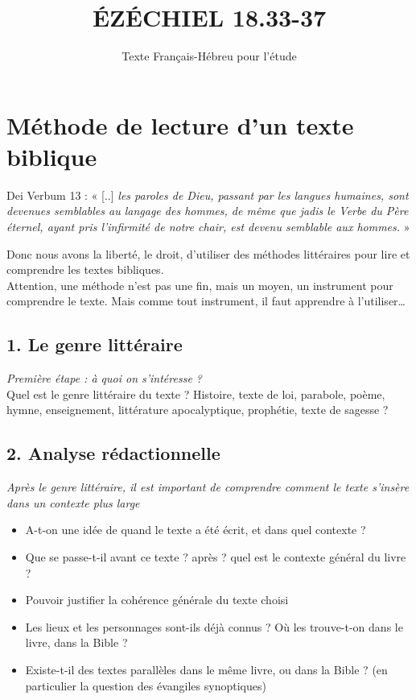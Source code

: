 \documentclass[12pt,a4paper,titlepage]{article}
\title{\vspace{5cm} \huge ÉZÉCHIEL 18.33-37}
\date{Texte Français-Hébreu pour l'étude}
\begin{document}
\maketitle
\vfill

\newpage 

\noindent
\section*{Méthode de lecture d'un texte biblique}
Dei Verbum 13 : « [..] \emph{les paroles de Dieu, passant par les langues humaines, sont devenues semblables au langage des hommes, de même que jadis le Verbe du Père éternel, ayant pris l’infirmité de notre chair, est devenu semblable aux hommes.} »\par
Donc nous avons la liberté, le droit, d’utiliser des méthodes littéraires pour lire et comprendre les textes bibliques.\\
Attention, une méthode n’est pas une fin, mais un moyen, un instrument pour comprendre le texte. Mais comme tout instrument, il faut apprendre à l’utiliser…

\subsection*{1. Le genre littéraire}
\emph{Première étape : à quoi on s’intéresse ?}\\
Quel est le genre littéraire du texte ? Histoire, texte de loi, parabole, poème, hymne, enseignement, littérature apocalyptique, prophétie, texte de sagesse ?
\subsection*{2. Analyse rédactionnelle}
\emph{Après le genre littéraire, il est important de comprendre comment le texte s’insère dans un contexte plus large}\\
\begin{itemize}[label=]
\item A-t-on une idée de quand le texte a été écrit, et dans quel contexte ?
\item Que se passe-t-il avant ce texte ? après ? quel est le contexte général du livre ?
\item Pouvoir justifier la cohérence générale du texte choisi
\item Les lieux et les personnages sont-ils déjà connus ? Où les trouve-t-on dans le livre, dans la Bible ?
\item Existe-t-il des textes parallèles dans le même livre, ou dans la Bible ? (en particulier la question des évangiles synoptiques)
\end{itemize}
\end{document}
